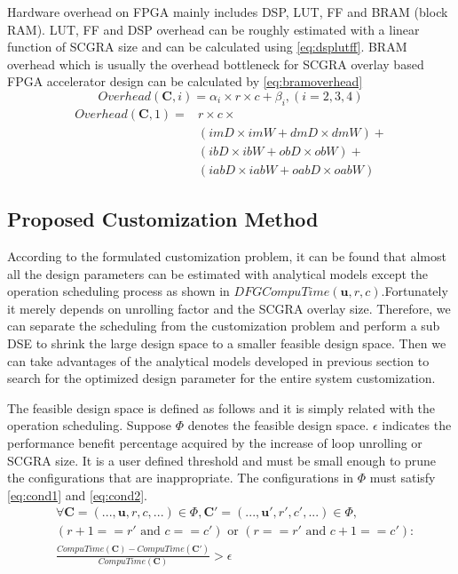 Hardware overhead on FPGA mainly includes DSP, LUT, FF and 
BRAM (block RAM). LUT, FF and DSP overhead can be roughly estimated 
with a linear function of SCGRA size and can be calculated using \eqref{eq:dsplutff}. 
BRAM overhead which is usually the overhead bottleneck for SCGRA overlay based 
FPGA accelerator design can be calculated by \eqref{eq:bramoverhead}
\begin{equation} \label{eq:dsplutff}
    Overhead(\bm{C}, i)=\alpha_i \times r \times c + \beta_i, (i=2,3,4)
\end{equation}
\begin{equation} \label{eq:bramoverhead}
    \begin{split}
        Overhead(\bm{C}, 1)=&r \times c \times \\ 
                               &(imD \times imW + dmD \times dmW) + \\
                               &(ibD \times ibW + obD \times obW) + \\
                               &(iabD \times iabW + oabD \times oabW) 
    \end{split}
\end{equation}

\subsection{Proposed Customization Method}
According to the formulated customization problem, it can be found that 
almost all the design parameters can be estimated with analytical models except 
the operation scheduling process as shown in $DFGCompuTime(\bm{u},r,c)$.Fortunately 
it merely depends on unrolling factor and the SCGRA overlay size. Therefore, 
we can separate the scheduling from the customization problem and 
perform a sub DSE to shrink the large design space to a smaller feasible 
design space. Then we can take advantages of the analytical models developed 
in previous section to search for the optimized design parameter for the entire 
system customization.

The feasible design space is defined as follows and it is simply related 
with the operation scheduling. Suppose $\Phi$ denotes the feasible 
design space. $\epsilon$ indicates the performance benefit percentage 
acquired by the increase of loop unrolling or SCGRA size. It is a user defined 
threshold and must be small enough to prune the configurations that are 
inappropriate. The configurations in $\Phi$ must satisfy \eqref{eq:cond1} 
and \eqref{eq:cond2}.
\begin{equation} \label{eq:cond1}
    \begin{split}
        &\forall \bm{C}=(...,\bm{u},r,c,...)\in \Phi, \bm{C'}=(...,\bm{u'},r',c',...) \in \Phi,\\ 
        & (r+1==r' \text{ and } c==c') \text{ or } (r==r' \text{ and } c+1==c'): \\ 
        &\frac{CompuTime(\bm{C})-CompuTime(\bm{C'})}{CompuTime(\bm{C})} > \epsilon \\
    \end{split}
\end{equation}

